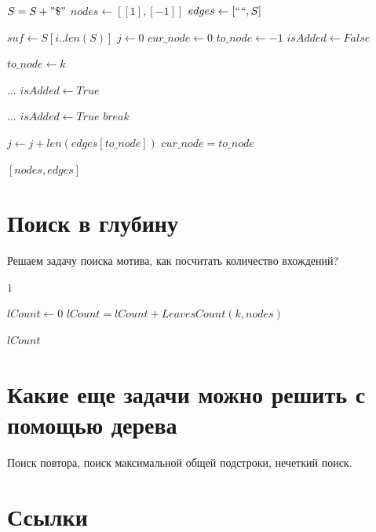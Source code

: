 \documentclass[letterpaper, 11pt]{article}
\begin{document}
\clearpage
\begin{algorithmic}[1]
\State $S = S + " \$ "$
\State $nodes \gets [[1], [-1]]$
\State $edges \gets [`` ``, S]$

\item[]
\State $suf \gets S[i..len(S)]$
\State $j \gets 0$
\State $cur\_node \gets 0$
\State $to\_node \gets -1$
\State $isAdded \gets False$

\item[]
\State $to\_node \gets k$
\EndIf
\EndFor

\item[]

\State $...$ 
\State $isAdded \gets True$
\Else
{}

\State $...$ 
\State $isAdded \gets True$
\State $break$
\EndIf

\EndFor

\State $j \gets j + len(edges[to\_node])$
\State $cur\_node = to\_node$

\EndIf

\EndWhile

\EndFor
\item[]
\State \Return $[nodes, edges]$
\EndProcedure
\end{algorithmic}


\clearpage
\section{Поиск в глубину}
\par
Решаем задачу поиска мотива, как посчитать количество вхождений?

\begin{algorithmic}[1]
\State \Return $1$
\EndIf
\item[]
\State $lCount \gets 0$
\State $lCount = lCount + LeavesCount(k, nodes)$
\EndFor
\item[]
\State \Return $lCount$
\EndProcedure
\end{algorithmic}

\section{Какие еще задачи можно решить с помощью дерева}
\par
Поиск повтора, поиск максимальной общей подстроки, нечеткий поиск.

\section{Ссылки}

\begingroup
\renewcommand{\section}[2]{}%
\begin{thebibliography}{7}


\end{thebibliography}
\endgroup
\end{document}
